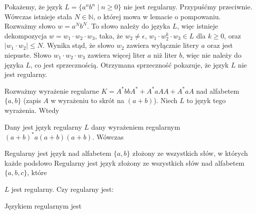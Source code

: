 \begin{example} 
    Pokażemy, że język $L = \{ a^nb^n \mid n \geq 0 \}$ nie jest regularny.
    Przypuśćmy przeciwnie. Wówczas istnieje stała $N \in \mathbb{N}$, 
    o której mowa w lemacie o pompowaniu. Rozważmy słowo $w = a^N b^N$. 
    To słowo należy do języka $L$, więc istnieje dekompozycja $w = w_1 \cdot w_2 \cdot w_3$,
    taka, że $w_2 \neq \epsilon$, $w_1 \cdot w_2^k \cdot w_3 \in L$ dla $k \geq 0$,
    oraz $|w_1 \cdot w_2| \leq N$. Wynika stąd, że słowo $w_2$ zawiera wyłącznie litery $a$
    oraz jest niepuste. Słowo $w_1 \cdot w_2 \cdot w_3$ zawiera więcej liter $a$ niż liter $b$,
    więc nie należy do języka $L$, co jest sprzecznością. Otrzymana sprzeczność pokazuje, że język
    $L$ nie jest regularny.
\end{example}

\begin{problems}
\prob Rozważmy wyrażenie regularne $K=A^* bb A^* + A^* a A A + A^* a A$ nad alfabetem $\{a,b\}$ (zapis $A$ w wyrażeniu to skrót na $(a + b)$). Niech $L$ to język tego wyrażenia. Wtedy
    
\prob Dany jest język regularny $L$ dany wyrażeniem regularnym $(a+b)^*a(a+b)(a+b)$. Wówczas
    
\prob Regularny jest język nad alfabetem $\{a,b\}$ złożony ze wszystkich słów, w których każde podsłowo
\prob Regularny jest język złożony ze wszystkich słów nad alfabetem $\{a,b,c\}$, które
    
\prob $L$ jest regularny. Czy regularny jest:

\prob Językiem regularnym jest
\end{problems}

